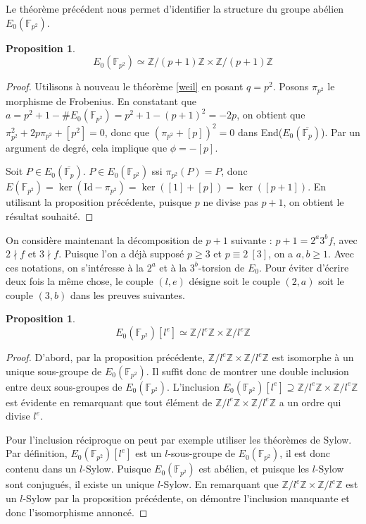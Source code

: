 \documentclass{article}
\theoremstyle{plain}%
\newtheorem{prop}[thm]{Proposition}
\theoremstyle{definition}%
\newcommand{\F}{\mathbb{F}}
\newcommand{\Z}{\mathbb{Z}}
\begin{document}
Le théorème précédent nous permet d'identifier la structure du groupe abélien $E_0(\F_{p^2})$.

\begin{prop}
  $$E_0(\F_{p^2}) \simeq \Z/(p+1)\Z \times \Z/(p+1)\Z$$
\end{prop}
\begin{proof}
  Utilisons à nouveau le théorème \ref{weil} en posant $q = p^2$. 
  Posons $\pi_{p^2}$ le morphisme de Frobenius.
  En constatant que $a=p^2 + 1 - \#E_0(\F_{p^2}) = p^2 + 1 - \left( p + 1 \right) ^2 = -2p$, on obtient que $\pi_{p^2}^2 + 2p\pi_{p^2} + [p^2] = 0$, donc que $\left( \pi_{p^2} + [p] \right) ^2 = 0$ dans End($E_0(\overline{\F_p})$). 
  Par un argument de degré, cela implique que $\phi = -[p]$. 

  Soit $P\in E_0(\overline{\F_{p}})$. $P \in E_0(\F_{p^2})$ ssi $\pi_{p^2}(P) = P$, donc $E(\F_{p^2}) = \ker(\text{Id} - \pi_{p^2}) = \ker([1] + [p]) = \ker([p+1])$.
  En utilisant la proposition précédente, puisque $p$ ne divise pas $p+1$, on obtient le résultat souhaité.
\end{proof}

On considère maintenant la décomposition de $p + 1$ suivante : $p + 1 = 2^a 3^b f$, avec $2 \nmid f$ et $3 \nmid f$. Puisque l'on a déjà supposé $p\ge 3$ et $p \equiv 2\ [3]$, on a $a, b\ge 1$. Avec ces notations, on s'intéresse à la $2^a$ et à la $3^b$-torsion de $E_0$. Pour éviter d'écrire deux fois la même chose, le couple $\left( l, e \right)$ désigne soit le couple $(2, a)$ soit le couple $(3, b)$ dans les preuves suivantes. 

\begin{prop}
  $$E_0(\F_{p^2})[l^e] \simeq \Z/l^e\Z \times \Z/l^e\Z$$
\end{prop}

\begin{proof}
  D'abord, par la proposition précédente, $\Z/l^e\Z \times \Z/l^e\Z$ est isomorphe à un unique sous-groupe de $E_0(\F_{p^2})$.
  Il suffit donc de montrer une double inclusion entre deux sous-groupes de $E_0(\F_{p^2})$.
  L'inclusion \allowbreak$E_0(\F_{p^2})[l^e] \supseteq \Z/l^e\Z \times \Z/l^e\Z$ est évidente en remarquant que tout élément de $\Z/l^e\Z \times \Z/l^e\Z$ a un ordre qui divise $l^e$.
  
  Pour l'inclusion réciproque on peut par exemple utiliser les théorèmes de Sylow. 
  Par définition, $E_0(\F_{p^2})[l^e]$ est un $l$-sous-groupe de $E_0(\F_{p^2})$, il est donc contenu dans un $l$-Sylow. 
  Puisque $E_0(\F_{p^2})$ est abélien, et puisque les $l$-Sylow sont conjugués, il existe un unique $l$-Sylow. 
  En remarquant que $\Z/l^e\Z \times \Z/l^e\Z$ est un $l$-Sylow par la proposition précédente, on démontre l'inclusion manquante et donc l'isomorphisme annoncé. 
\end{proof}
\end{document}
